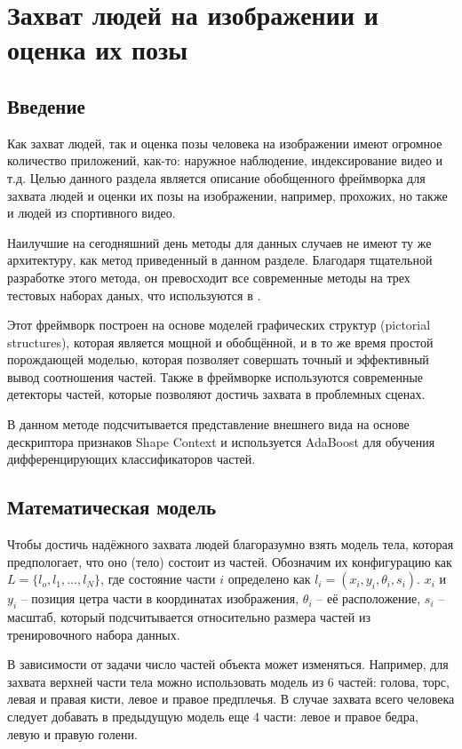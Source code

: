 \section{Захват людей на изображении и оценка их позы}

\subsection{Введение}
Как захват людей, так и оценка позы человека на изображении имеют огромное количество приложений, как-то: наружное наблюдение, индексирование видео и т.д. Целью данного раздела является описание обобщенного фреймворка для захвата людей и оценки их позы на изображении, например, прохожих, но также и людей из спортивного видео.

Наилучшие на сегодняшний день методы для данных случаев не имеют ту же архитектуру, как метод приведенный в данном разделе. Благодаря тщательной разработке этого метода, он превосходит все современные методы на трех тестовых наборах даных, что используются в \cite{andriluka09}.

Этот фреймворк построен на основе моделей графических структур (pictorial structures), которая является мощной и обобщённой, и в то же время простой порождающей моделью, которая позволяет совершать точный и эффективный вывод соотношения частей. Также в фреймворке используются современные детекторы частей, которые позволяют достичь захвата в проблемных сценах.

В данном методе подсчитывается представление внешнего вида на основе дескриптора признаков Shape Context и используется AdaBoost для обучения дифференцирующих классификаторов частей.

\subsection{Математическая модель}

Чтобы достичь надёжного захвата людей благоразумно взять модель тела, которая предпологает, что оно (тело) состоит из частей. Обозначим их конфигурацию как \(L = \{l_o, l_1, \dots, l_N\}\), где состояние части \(i\) определено как \(l_i = (x_i, y_i, \theta_i, s_i)\). \(x_i\) и \(y_i\) -- позиция цетра части в координатах изображения, \(\theta_i\) -- её расположение, \(s_i\) -- масштаб, который подсчитывается относительно размера частей из тренировочного набора данных.

В зависимости от задачи число частей объекта может изменяться. Например, для захвата верхней части тела можно использовать модель из 6 частей: голова, торс, левая и правая кисти, левое и правое предплечья. В случае захвата всего человека следует добавать в предыдущую модель еще 4 части: левое и правое бедра, левую и правую голени.

